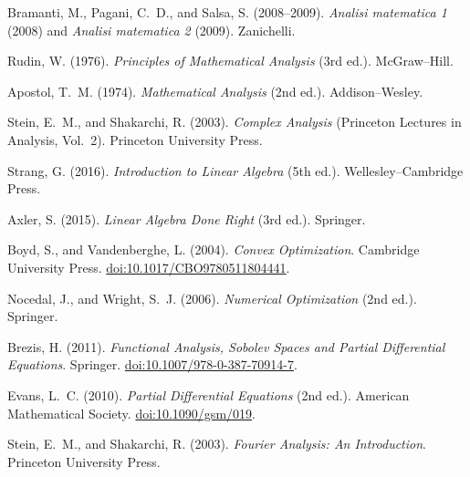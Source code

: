 \begin{enumerate}[label={\textup{[\arabic*]}},ref=\arabic*,leftmargin=*,itemsep=0.5em]
\item \label{ref:bramanti}
Bramanti, M., Pagani, C.~D., and Salsa, S. (2008--2009). \emph{Analisi matematica 1} (2008) and \emph{Analisi matematica 2} (2009). Zanichelli.

\item \label{ref:rudin-principles}
Rudin, W. (1976). \emph{Principles of Mathematical Analysis} (3rd ed.). McGraw--Hill.

\item \label{ref:apostol}
Apostol, T.~M. (1974). \emph{Mathematical Analysis} (2nd ed.). Addison--Wesley.

\item \label{ref:stein-complex}
Stein, E.~M., and Shakarchi, R. (2003). \emph{Complex Analysis} (Princeton Lectures in Analysis, Vol.~2). Princeton University Press.

\item \label{ref:strang}
Strang, G. (2016). \emph{Introduction to Linear Algebra} (5th ed.). Wellesley--Cambridge Press.

\item \label{ref:axler}
Axler, S. (2015). \emph{Linear Algebra Done Right} (3rd ed.). Springer.

\item \label{ref:boyd-convex}
Boyd, S., and Vandenberghe, L. (2004). \emph{Convex Optimization}. Cambridge University Press. \href{https://doi.org/10.1017/CBO9780511804441}{doi:10.1017/CBO9780511804441}.

\item \label{ref:nocedal}
Nocedal, J., and Wright, S.~J. (2006). \emph{Numerical Optimization} (2nd ed.). Springer.

\item \label{ref:brezis}
Brezis, H. (2011). \emph{Functional Analysis, Sobolev Spaces and Partial Differential Equations}. Springer. \href{https://doi.org/10.1007/978-0-387-70914-7}{doi:10.1007/978-0-387-70914-7}.

\item \label{ref:evans}
Evans, L.~C. (2010). \emph{Partial Differential Equations} (2nd ed.). American Mathematical Society. \href{https://doi.org/10.1090/gsm/019}{doi:10.1090/gsm/019}.

\item \label{ref:stein-fourier}
Stein, E.~M., and Shakarchi, R. (2003). \emph{Fourier Analysis: An Introduction}. Princeton University Press.


\end{enumerate}
